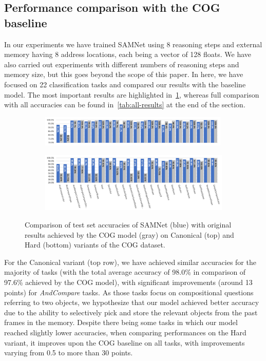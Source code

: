 \subsection{Performance comparison with the COG baseline}

In our experiments we have trained SAMNet using 8 reasoning steps and external memory having 8 address locations, each being a vector of 128 floats.
We have also carried out experiments with different numbers of reasoning steps and memory size, but this goes beyond the scope of this paper.
In here, we have focused on 22 classification tasks and compared our results with the baseline model.
The most important results are highlighted in~\cref{fig:samnet_cog_detailed}, whereas full comparison with all accuracies can be found in~\cref{tab:all-results} at the end of the section.

\begin{figure}[!t]
	\centering
  \begin{subfigure}{\textwidth}
    \includegraphics[width=0.99\textwidth]{../results/samnet_cog_orig_canonical_no_labels.png}
  \end{subfigure}%
  \newline
  \begin{subfigure}{\textwidth}
	\includegraphics[width=\textwidth]{../results/samnet_cog_orig_hard.png}
  \end{subfigure}%
\caption{Comparison of test set accuracies of SAMNet (blue) with original results achieved by the COG model (gray) on Canonical (top) and Hard (bottom) variants of the COG dataset.}
\label{fig:samnet_cog_detailed}
\end{figure}


For the Canonical variant (top row), we have achieved similar accuracies for the majority of tasks (with the total average accuracy of 98.0\% in comparison of 97.6\% achieved by the COG model), with significant improvements (around 13 points) for \textit{AndCompare} tasks.
As those tasks focus on compositional questions referring to two objects, we hypothesize that our model achieved better accuracy due to the ability to selectively pick and store the relevant objects from the past frames in the memory.
Despite there being some tasks in which our model reached slightly lower accuracies,
when comparing performances on the Hard variant, it improves upon the COG baseline on all tasks, with improvements varying from 0.5 to more than 30 points.



